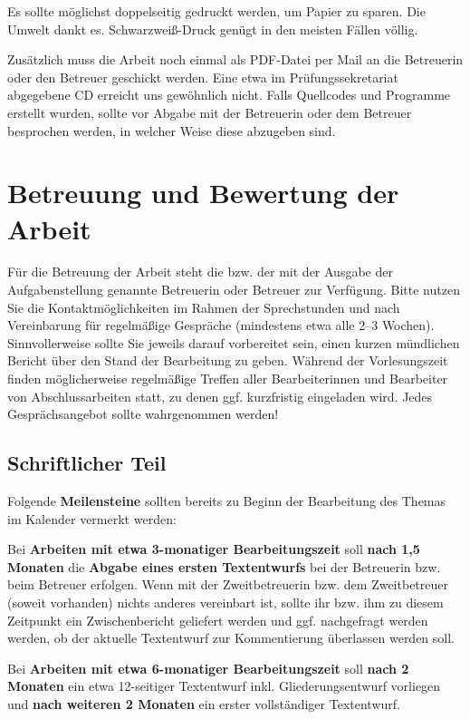 \documentclass[
    fontsize=12pt,
    headings=small,
    parskip=half,           %
    bibliography=totoc,
    numbers=noenddot,       %
    open=any,               %
    ]{scrreprt}
\begin{document}
Es sollte möglichst doppelseitig gedruckt werden, um Papier zu sparen. Die Umwelt dankt es. Schwarzweiß-Druck genügt in den meisten Fällen völlig.

Zusätzlich muss die Arbeit noch einmal als PDF-Datei per Mail an die Betreuerin oder den Betreuer geschickt werden. Eine etwa im Prüfungssekretariat abgegebene CD erreicht uns gewöhnlich nicht. Falls Quellcodes und Programme erstellt wurden, sollte vor Abgabe mit der Betreuerin oder dem Betreuer besprochen werden, in welcher Weise diese abzugeben sind.

\chapter{Betreuung und Bewertung der Arbeit}

Für die Betreuung der Arbeit steht die bzw. der mit der Ausgabe der Aufgabenstellung genannte Betreuerin oder Betreuer zur Verfügung. Bitte nutzen Sie die Kontaktmöglichkeiten im Rahmen der Sprechstunden und nach Vereinbarung für regelmäßige Gespräche (mindestens etwa alle 2--3 Wochen). Sinnvollerweise sollte Sie jeweils darauf vorbereitet sein, einen kurzen mündlichen Bericht über den Stand der Bearbeitung zu geben. Während der Vorlesungszeit finden möglicherweise regelmäßige Treffen aller Bearbeiterinnen und Bearbeiter von Abschlussarbeiten statt, zu denen ggf. kurzfristig eingeladen wird. Jedes Gesprächsangebot sollte wahrgenommen werden!

\section{Schriftlicher Teil}

Folgende \textbf{Meilensteine} sollten bereits zu Beginn der Bearbeitung des Themas im Kalender vermerkt werden:

Bei \textbf{Arbeiten mit etwa 3-monatiger Bearbeitungszeit} soll \textbf{nach 1,5 Monaten} die \textbf{Abgabe eines ersten Textentwurfs} bei der Betreuerin bzw. beim Betreuer erfolgen. Wenn mit der Zweitbetreuerin bzw. dem Zweitbetreuer (soweit vorhanden) nichts anderes vereinbart ist, sollte ihr bzw. ihm zu diesem Zeitpunkt ein Zwischenbericht geliefert werden und ggf. nachgefragt werden werden, ob der aktuelle Textentwurf zur Kommentierung überlassen werden soll.

Bei \textbf{Arbeiten mit etwa 6-monatiger Bearbeitungszeit} soll \textbf{nach 2 Monaten} ein etwa 12-seitiger Textentwurf inkl. Gliederungsentwurf vorliegen und \textbf{nach weiteren 2 Monaten} ein erster vollständiger Textentwurf.
\end{document}

